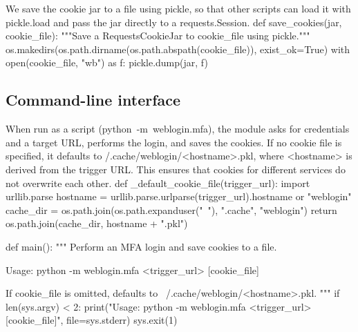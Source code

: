 We save the cookie jar to a file using {\Tt{}pickle\nwendquote}, so that other
scripts can load it with {\Tt{}pickle.load\nwendquote} and pass the jar directly to
a {\Tt{}requests.Session\nwendquote}.
\nwenddocs{}\endmoddef\nwstartdeflinemarkup{}\nwenddeflinemarkup
def save_cookies(jar, cookie_file):
  """Save a RequestsCookieJar to cookie_file using pickle."""
  os.makedirs(os.path.dirname(os.path.abspath(cookie_file)), exist_ok=True)
  with open(cookie_file, "wb") as f:
    pickle.dump(jar, f)
\nwendcode{}\nwdocspar

\subsection{Command-line interface}

When run as a script ({\Tt{}python\ -m\ weblogin.mfa\nwendquote}), the module asks for
credentials and a target URL, performs the login, and saves the cookies.
If no cookie file is specified, it defaults to
{/.cache/weblogin/<hostname>.pkl\nwendquote}, where {\Tt{}<hostname>\nwendquote} is derived
from the trigger URL.
This ensures that cookies for different services do not overwrite each
other.
\nwenddocs{}\endmoddef\nwstartdeflinemarkup{}\nwenddeflinemarkup
def _default_cookie_file(trigger_url):
  import urllib.parse
  hostname = urllib.parse.urlparse(trigger_url).hostname or "weblogin"
  cache_dir = os.path.join(os.path.expanduser("~"), ".cache", "weblogin")
  return os.path.join(cache_dir, hostname + ".pkl")

def main():
  """
  Perform an MFA login and save cookies to a file.

  Usage: python -m weblogin.mfa <trigger_url> [cookie_file]

  If cookie_file is omitted, defaults to ~/.cache/weblogin/<hostname>.pkl.
  """
  if len(sys.argv) < 2:
    print("Usage: python -m weblogin.mfa <trigger_url> [cookie_file]",
          file=sys.stderr)
    sys.exit(1)

